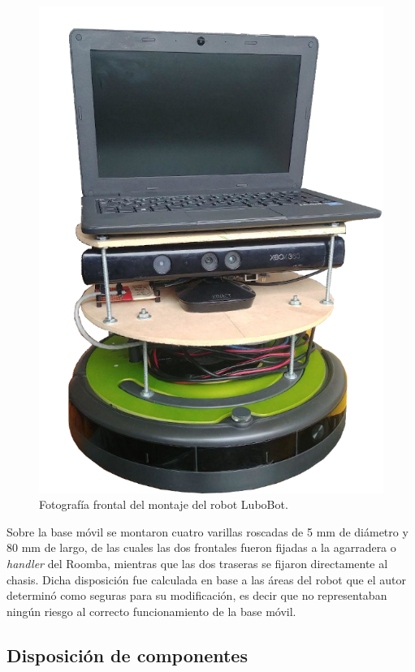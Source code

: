 \begin{figure}[ht]
  \centering
  \includegraphics[scale=0.5]{./Figures/lubobot.png}
  \caption{Fotografía frontal del montaje del robot LuboBot.}
  \label{fig:lubobotReal}
\end{figure}

\newpage

Sobre la base móvil se montaron cuatro varillas roscadas de 5 mm de diámetro y 80 mm de largo, de las cuales las dos frontales fueron fijadas a la agarradera o  \textit{handler} del Roomba, mientras que las dos traseras se fijaron directamente al chasis. Dicha disposición fue calculada en base a las áreas del robot que el autor determinó como seguras para su modificación, es decir que no representaban ningún riesgo al correcto funcionamiento de la base móvil.

\subsection{Disposición de componentes}

